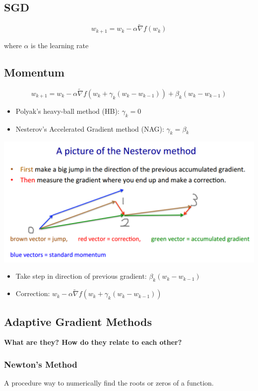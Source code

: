 \documentclass[12pt]{article}
\begin{document}
\subsection{SGD}
$$w_{k+1} = w_k - \alpha \tilde{ \nabla } f ( w_k ) $$

where $\alpha$ is the learning rate

\subsection{Momentum}
$$w_{k+1} = w_k - \alpha \tilde{ \nabla } f ( w_k + \gamma_k (w_k - w_{k-1})) + \beta_k (w_k - w_{k-1}) $$

\begin{itemize}
	\item Polyak's heavy-ball method (HB): $\gamma_k = 0$
	\item Nesterov's Accelerated Gradient method (NAG): $\gamma_k = \beta_k$
\end{itemize}

\vspace{5mm}
\includegraphics[width=1\textwidth]{nesterov}

\begin{itemize}
	\item Take step in direction of previous gradient: $ \beta_k (w_k - w_{k-1})$
	\item Correction: $w_k - \alpha \tilde{ \nabla } f ( w_k + \gamma_k (w_k - w_{k-1}))$
\end{itemize}

\newpage

\subsection{Adaptive Gradient Methods}
\textbf{ What are they? How do they relate to each other? }

\subsubsection{Newton's Method}
A procedure way to numerically find the roots or zeros of a function.
\end{document}
